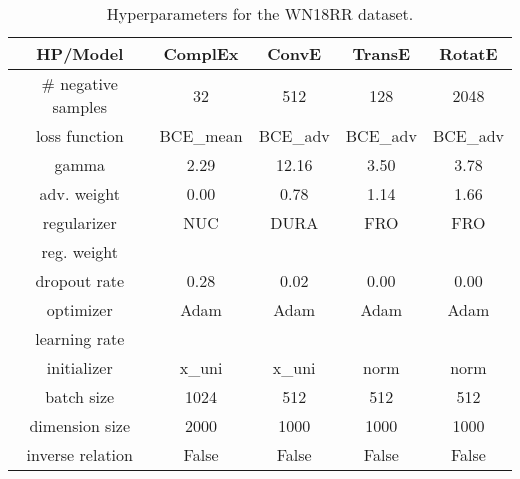 \documentclass[11pt,a4paper]{article}
\begin{document}
  \begin{table*}[ht]
    \centering
\caption{Hyperparameters for the WN18RR dataset.}
    \label{tab:hp_wn18rr}
    \small
\begin{tabular}{c|c|c|c|c}
      \toprule
      HP/Model            & ComplEx               & ConvE                  & TransE                 & RotatE                 \\
      \midrule
      \# negative samples & 32                    & 512                    & 128                    & 2048                   \\
      \midrule
      loss function       & BCE\_mean             & BCE\_adv               & BCE\_adv               & BCE\_adv               \\
      gamma               & 2.29                  & 12.16                  & 3.50                   & 3.78                   \\
      adv. weight         & 0.00                  & 0.78                   & 1.14                   & 1.66                   \\
      \midrule
      regularizer         & NUC                   & DURA                   & FRO                    & FRO                    \\
      reg. weight         &  &  &  &   \\
      dropout rate        & 0.28                  & 0.02                   & 0.00                   & 0.00                   \\
      \midrule
      optimizer           & Adam                  & Adam                   & Adam                   & Adam                   \\
      learning rate       &  &  &  &  \\
      initializer         & x\_uni                & x\_uni                 & norm                   & norm                   \\
      \midrule
      batch size          & 1024                  & 512                    & 512                    & 512                    \\
      dimension size      & 2000                  & 1000                   & 1000                   & 1000                   \\
      inverse relation    & False                 & False                  & False                  & False                  \\
      \bottomrule
    \end{tabular}
\end{table*}
  
\end{document}
